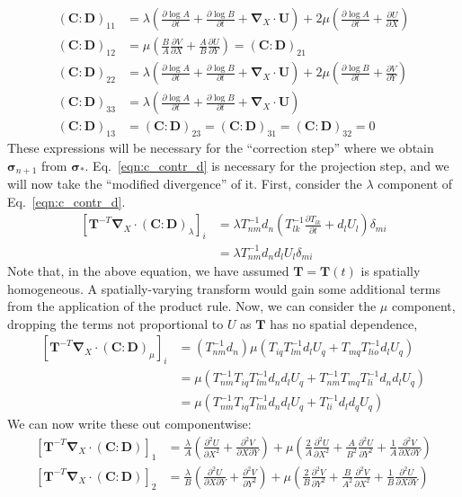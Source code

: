 \documentclass[11pt]{article}
\newcommand{\p}{\partial}
\newcommand{\bsig}{\boldsymbol\sigma}
\newcommand{\bC}{\mathbf{C}}
\newcommand{\bD}{\mathbf{D}}
\newcommand{\bT}{\mathbf{T}}
\newcommand{\bU}{\mathbf{U}}
\begin{document}
\begin{align*}
    (\bC : \bD)_{11} &= \lambda\left(\frac{\p \log A}{\p t} + \frac{\p \log B}{\p t} + \boldsymbol{\nabla}_X\cdot\bU\right) + 2\mu\left(\frac{\p \log A}{\p t} + \frac{\p U}{\p X}\right)\\
    (\bC : \bD)_{12} &= \mu\left(\frac{B}{A}\frac{\p V}{\p X} + \frac{A}{B}\frac{\p U}{\p Y}\right) = (\bC : \bD)_{21}\\
    (\bC : \bD)_{22} &= \lambda \left(\frac{\p \log A}{\p t} + \frac{\p \log B}{\p t} + \boldsymbol{\nabla}_X\cdot\bU\right) + 2\mu\left(\frac{\p \log B}{\p t} + \frac{\p V}{\p Y}\right)\\
    (\bC : \bD)_{33} &= \lambda\left(\frac{\p \log A}{\p t} + \frac{\p \log B}{\p t} + \boldsymbol{\nabla}_X\cdot \mathbf{U}\right)\\
    (\bC : \bD)_{13} &= (\bC : \bD)_{23} = (\bC : \bD)_{31} = (\bC : \bD)_{32} = 0
\end{align*}
These expressions will be necessary for the ``correction step'' where we obtain $\bsig_{n+1}$ from $\bsig_*$. Eq.~\ref{eqn:c_contr_d} is necessary for the projection step, and we will now take the ``modified divergence'' of it. First, consider the $\lambda$ component of Eq.~\ref{eqn:c_contr_d}.
\begin{align*}
    \left[\bT^{-T}\boldsymbol{\nabla}_X\cdot(\bC:\bD)_\lambda\right]_i &= \lambda T^{-1}_{nm}d_n\left(T^{-1}_{lk}\frac{\p T_{lk}}{\p t} + d_lU_l\right)\delta_{mi}\\
    &= \lambda T^{-1}_{nm}d_nd_lU_l\delta_{mi}
\end{align*}
Note that, in the above equation, we have assumed $\bT = \bT(t)$ is spatially homogeneous. A spatially-varying transform would gain some additional terms from the application of the product rule. Now, we can consider the $\mu$ component, dropping the terms not proportional to $U$ as $\bT$ has no spatial dependence,
\begin{align}
    \left[\bT^{-T}\boldsymbol{\nabla}_X\cdot(\bC:\bD)_\mu\right]_i &= \left(T^{-1}_{nm}d_n\right)\mu\left(T_{iq}T^{-1}_{lm}d_l U_q + T_{mq}T^{-1}_{lio}d_lU_q\right)\nonumber\\
    &= \mu\left(T^{-1}_{nm}T_{iq}T^{-1}_{lm}d_nd_lU_q + T^{-1}_{nm}T_{mq}T^{-1}_{li}d_nd_lU_q\right)\nonumber\\
    &= \mu\left(T^{-1}_{nm}T_{iq}T^{-1}_{lm}d_nd_lU_q + T^{-1}_{li}d_ld_qU_q\right)
    \label{eqn:divCD}
\end{align}
We can now write these out componentwise:
\begin{align*}
    \left[\bT^{-T}\boldsymbol{\nabla}_X\cdot(\bC:\bD)\right]_1 &= \frac{\lambda}{A}\left(\frac{\p^2 U}{\p X^2} + \frac{\p^2 V}{\p X\p Y}\right) + \mu\left(\frac{2}{A}\frac{\p^2 U}{\p X^2} + \frac{A}{B^2}\frac{\p^2 U}{\p Y^2} + \frac{1}{A}\frac{\p^2 V}{\p X\p Y}\right)\\
    \left[\bT^{-T}\boldsymbol{\nabla}_X\cdot(\bC:\bD)\right]_2 &= \frac{\lambda}{B}\left(\frac{\p^2 U}{\p X \p Y} + \frac{\p^2 V}{\p Y^2}\right) + \mu\left(\frac{2}{B}\frac{\p^2 V}{\p Y^2} + \frac{B}{A^2}\frac{\p^2 V}{\p X^2} + \frac{1}{B}\frac{\p^2 U}{\p X\p Y}\right)
\end{align*}
\end{document}
